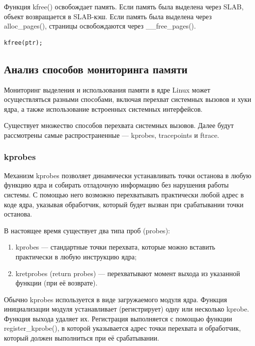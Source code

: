 Функция kfree() освобождает память.
Если память была выделена через SLAB, объект возвращается в SLAB-кэш.
Если память была выделена через alloc\_pages(), страницы освобождаются через \_\_free\_pages().

\begin{lstlisting}[caption={kfree}]
kfree(ptr);
\end{lstlisting}

\subsection{Анализ способов мониторинга памяти}

Мониторинг выделения и использования памяти в ядре Linux может осуществляться разными способами, включая перехват системных вызовов и хуки ядра, а также использование встроенных системных интерфейсов.


Существует множество способов перехвата системных вызовов.
Далее будут рассмотрены самые распространенные --- kprobes, tracepoints и ftrace.

\subsubsection*{kprobes}

Механизм kprobes позволяет динамически устанавливать точки останова в любую функцию ядра и собирать отладочную информацию без нарушения работы системы.
С помощью него возможно перехватывать практически любой адрес в коде ядра, указывая обработчик, который будет вызван при срабатывании точки останова.~\cite{kprobe}

В настоящее время существует два типа проб (probes):
\begin{enumerate}
    \item kprobes --- стандартные точки перехвата, которые можно вставить практически в любую инструкцию ядра;
    \item kretprobes (return probes) --- перехватывают момент выхода из указанной функции (при её возврате).
\end{enumerate}

Обычно kprobes используется в виде загружаемого модуля ядра.
Функция инициализации модуля устанавливает (регистрирует) одну или несколько kprobe.
Функция выхода удаляет их.
Регистрация выполняется с помощью функции register\_kprobe(), в которой указывается адрес точки перехвата и обработчик, который должен выполниться при её срабатывании.~\cite{kprobe}

